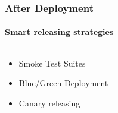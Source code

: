 \documentclass{beamer}
\begin{document}
\begin{frame}
	\frametitle{After Deployment}
	\framesubtitle{Smart releasing strategies}
\begin{columns}
 \begin{column}{.49\textwidth}
	\begin{itemize}
		\item Smoke Test Suites
		\item Blue/Green Deployment
		\item Canary releasing
	\end{itemize}
\end{column}
\begin{column}{.49\textwidth}
	\begin{figure}
		\begin{center}

\end{center}
\end{figure}
\end{column}
\end{columns}
\end{frame}
\end{document}
